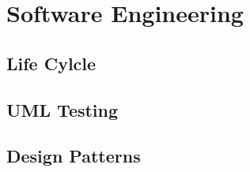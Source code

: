 \chapter{Software Engineering}
\section{Life Cylcle}
\section{UML Testing}
\section {Design Patterns}